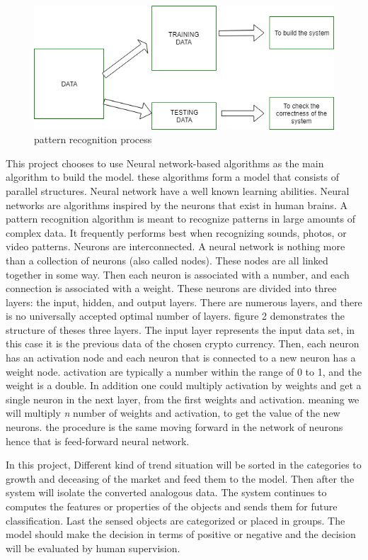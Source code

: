 \documentclass[10pt,twocolumn]{article}
\begin{document}
\begin{figure}
    \centering
    \includegraphics[width=.95\linewidth]{training-and-testing.png}
    \caption{
        pattern recognition process
    }
    \label{fig:first-page}
\end{figure}
	This project chooses to use Neural network-based algorithms as the main algorithm to build the model. these algorithms form a model that consists of parallel structures. Neural network have a well known learning abilities. Neural networks are algorithms inspired by the neurons that exist in human brains. A pattern recognition algorithm is meant to recognize patterns in large amounts of complex data. It frequently performs best when recognizing sounds, photos, or video patterns. Neurons are interconnected. A neural network is nothing more than a collection of neurons (also called nodes). These nodes are all linked together in some way. Then each neuron is associated with a number, and each connection is associated with a weight. These neurons are divided into three layers: the input, hidden, and output layers. There are numerous layers, and there is no universally accepted optimal number of layers. figure 2 demonstrates the structure of theses three layers. The input layer represents the input data set, in this case it is the previous data of the chosen crypto currency. Then, each neuron has an activation node and each neuron that is connected to a new neuron has a weight node. activation are typically a number within the range of 0 to 1, and the weight is a double. In addition one could multiply activation by weights and get a single neuron in the next layer, from the first weights and activation. meaning we will multiply \textit{n} number of weights and activation, to get the value of the new neurons. the procedure is the same moving forward in the network of neurons hence that is feed-forward neural network. 
    
    In this project, Different kind of trend situation will be sorted in the categories to growth and deceasing of the market and feed them to the model. Then after the system will isolate the converted analogous data. The system continues to computes the features or properties of the objects and sends them for future classification. Last the sensed objects are categorized or placed in groups. The model should make the decision in terms of positive or negative and the decision will be evaluated by human supervision. 
    
\end{document}
